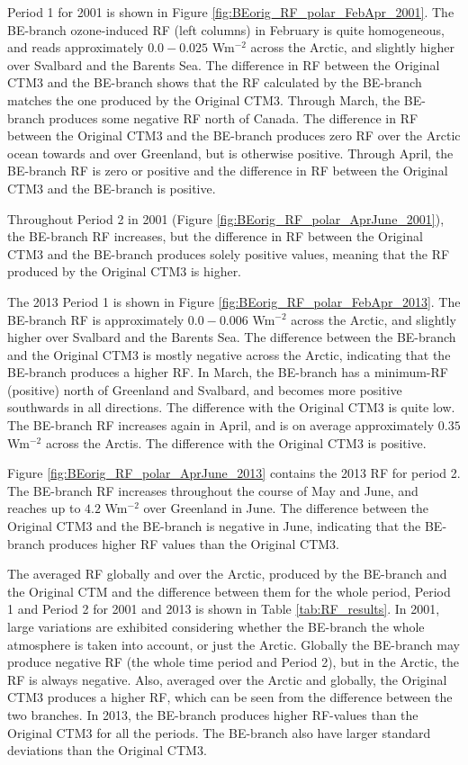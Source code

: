 Period 1 for 2001 is shown in Figure \ref{fig:BEorig_RF_polar_FebApr_2001}. The BE-branch ozone-induced RF (left columns) in February is quite homogeneous, and reads approximately $0.0-0.025$ Wm$^{-2}$ across the Arctic, and slightly higher over Svalbard and the Barents Sea. The difference in RF between the Original CTM3 and the BE-branch shows that the RF calculated by the BE-branch matches the one produced by the Original CTM3. Through March, the BE-branch produces some negative RF north of Canada. The difference in RF between the Original CTM3 and the BE-branch produces zero RF over the Arctic ocean towards and over Greenland, but is otherwise positive. Through April, the BE-branch RF is zero or positive and the difference in RF between the Original CTM3 and the BE-branch is positive.

\medskip

Throughout Period 2 in 2001 (Figure \ref{fig:BEorig_RF_polar_AprJune_2001}), the BE-branch RF increases, but the difference in RF between the Original CTM3 and the BE-branch produces solely positive values, meaning that the RF produced by the Original CTM3 is higher.

\medskip

The 2013 Period 1 is shown in Figure \ref{fig:BEorig_RF_polar_FebApr_2013}. The BE-branch RF is approximately $0.0-0.006$ Wm$^{-2}$ across the Arctic, and slightly higher over Svalbard and the Barents Sea. The difference between the BE-branch and the Original CTM3 is mostly negative across the Arctic, indicating that the BE-branch produces a higher RF. In March, the BE-branch has a minimum-RF (positive) north of Greenland and Svalbard, and becomes more positive southwards in all directions. The difference with the Original CTM3 is quite low. The BE-branch RF increases again in April, and is on average approximately $0.35$ Wm$^{-2}$ across the Arctis. The difference with the Original CTM3 is positive.

\medskip

Figure \ref{fig:BEorig_RF_polar_AprJune_2013} contains the 2013 RF for period 2. The BE-branch RF increases throughout the course of May and June, and reaches up to $4.2$ Wm$^{-2}$ over Greenland in June. The difference between the Original CTM3 and the BE-branch is negative in June, indicating that the BE-branch produces higher RF values than the  Original CTM3.

\medskip

The averaged RF globally and over the Arctic, produced by the BE-branch and the Original CTM and the difference between them for the whole period, Period 1 and Period 2 for 2001 and 2013 is shown in Table \ref{tab:RF_results}. In 2001, large variations are exhibited considering whether the BE-branch the whole atmosphere is taken into account, or just the Arctic. Globally the BE-branch may produce negative RF (the whole time period and Period 2), but in the Arctic, the RF is always negative. Also, averaged over the Arctic and globally, the Original CTM3 produces a higher RF, which can be seen from the difference between the two branches. In 2013, the BE-branch produces higher RF-values than the Original CTM3 for all the periods. The BE-branch also have larger standard deviations than the Original CTM3. 

